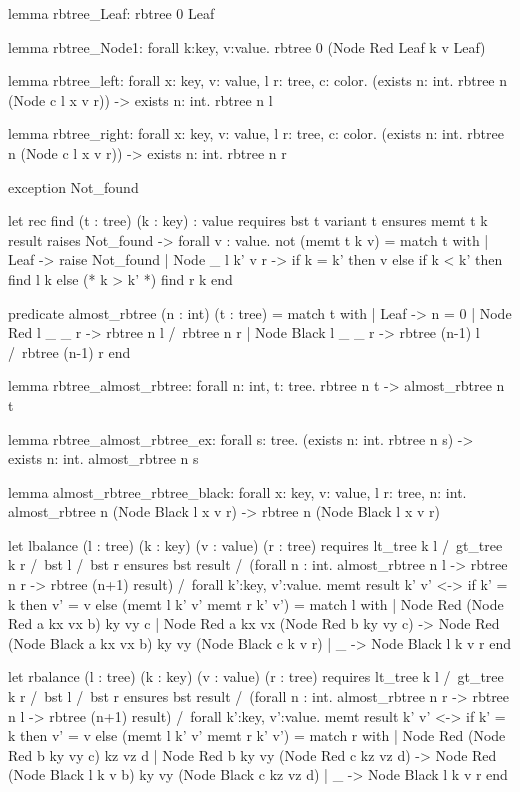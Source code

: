 \begin{whylang}
  lemma rbtree_Leaf:
    rbtree 0 Leaf

  lemma rbtree_Node1:
    forall k:key, v:value. rbtree 0 (Node Red Leaf k v Leaf)

  lemma rbtree_left:
    forall x: key, v: value, l r: tree, c: color.
    (exists n: int. rbtree n (Node c l x v r)) -> exists n: int. rbtree n l

  lemma rbtree_right:
    forall x: key, v: value, l r: tree, c: color.
    (exists n: int. rbtree n (Node c l x v r)) -> exists n: int. rbtree n r

  exception Not_found

  let rec find (t : tree) (k : key) : value
    requires { bst t }
    variant { t }
    ensures { memt t k result }
    raises { Not_found -> forall v : value. not (memt t k v) }
  = match t with
    | Leaf -> raise Not_found
    | Node _ l k' v r ->
        if k = k' then v
        else if k < k' then find l k
        else (* k > k' *) find r k
    end

  predicate almost_rbtree (n : int) (t : tree) =
    match t with
    | Leaf ->
        n = 0
    | Node Red   l _ _ r ->
        rbtree n l /\ rbtree n r
    | Node Black l _ _ r ->
        rbtree (n-1) l /\ rbtree (n-1) r
    end

  lemma rbtree_almost_rbtree:
    forall n: int, t: tree. rbtree n t -> almost_rbtree n t

  lemma rbtree_almost_rbtree_ex:
    forall s: tree.
    (exists n: int. rbtree n s) -> exists n: int. almost_rbtree n s

  lemma almost_rbtree_rbtree_black:
    forall x: key, v: value, l r: tree, n: int.
    almost_rbtree n (Node Black l x v r) -> rbtree n (Node Black l x v r)

  let lbalance (l : tree) (k : key) (v : value) (r : tree)
    requires { lt_tree k l /\ gt_tree k r /\ bst l /\ bst r }
    ensures { bst result /\
      (forall n : int. almost_rbtree n l -> rbtree n r -> rbtree (n+1) result)
      /\
      forall k':key, v':value.
        memt result k' v' <->
        if k' = k then v' = v else (memt l k' v' \/ memt r k' v') }
  = match l with
    | Node Red (Node Red a kx vx b) ky vy c
    | Node Red a kx vx (Node Red b ky vy c) ->
        Node Red (Node Black a kx vx b) ky vy (Node Black c k v r)
    | _ ->
        Node Black l k v r
    end

  let rbalance (l : tree) (k : key) (v : value) (r : tree)
    requires { lt_tree k l /\ gt_tree k r /\ bst l /\ bst r }
    ensures { bst result /\
      (forall n : int. almost_rbtree n r -> rbtree n l -> rbtree (n+1) result)
      /\
      forall k':key, v':value.
        memt result k' v' <->
        if k' = k then v' = v else (memt l k' v' \/ memt r k' v') }
  = match r with
    | Node Red (Node Red b ky vy c) kz vz d
    | Node Red b ky vy (Node Red c kz vz d) ->
        Node Red (Node Black l k v b) ky vy (Node Black c kz vz d)
    | _ ->
        Node Black l k v r
    end


\end{whylang}
